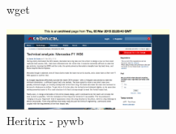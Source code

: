 \documentclass{article}
\begin{document}
\begin{center}
\begin{figure}[ht]
    \caption{wget}
    \label{fig:url3_wget}
\end{figure}
\begin{figure}[ht]
    \centering
    \includegraphics[width=0.475\textwidth,natwidth=700,natheight=700]{ex3-heritrix-pywb.png}
    \caption{Heritrix - pywb}
    \label{fig:url3_heritrix_pywb}
\end{figure}
\end{center}

\clearpage
\end{document}
